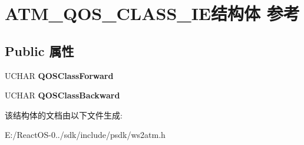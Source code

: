 \hypertarget{struct_a_t_m___q_o_s___c_l_a_s_s___i_e}{}\section{A\+T\+M\+\_\+\+Q\+O\+S\+\_\+\+C\+L\+A\+S\+S\+\_\+\+I\+E结构体 参考}
\label{struct_a_t_m___q_o_s___c_l_a_s_s___i_e}
\subsection*{Public 属性}
\begin{DoxyCompactItemize}
\item 
\mbox{\label{struct_a_t_m___q_o_s___c_l_a_s_s___i_e_a75d2fe4232f5012e60e7181e84a7bbfd}} 
U\+C\+H\+AR {\bfseries Q\+O\+S\+Class\+Forward}
\item 
\mbox{\label{struct_a_t_m___q_o_s___c_l_a_s_s___i_e_a801dc1cc158f420b089b0f232d447545}} 
U\+C\+H\+AR {\bfseries Q\+O\+S\+Class\+Backward}
\end{DoxyCompactItemize}


该结构体的文档由以下文件生成\+:\begin{DoxyCompactItemize}
\item 
E\+:/\+React\+O\+S-\/0../sdk/include/psdk/ws2atm.\+h\end{DoxyCompactItemize}
